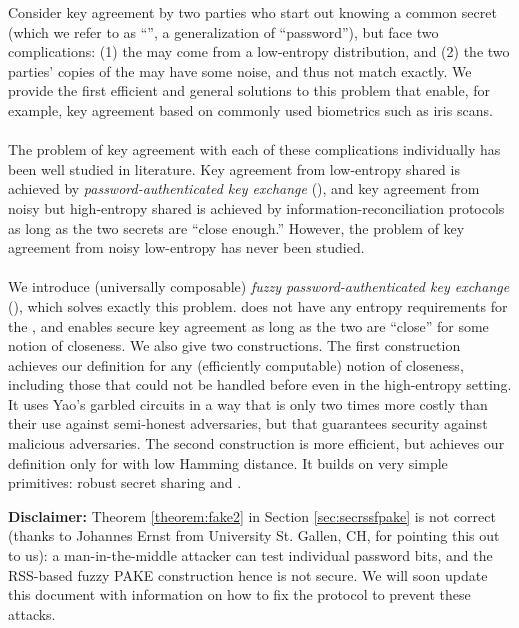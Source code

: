 Consider key agreement by two parties who start out knowing a common secret (which we refer to as ``\password'', a generalization of ``password''),
but face two complications: 
(1) the \password may come from a low-entropy distribution, and 
(2) the two parties' copies of the \password may have some noise, and thus not match exactly.
We provide the first efficient and general solutions to this problem that enable, for example, key agreement based on commonly used biometrics such as iris scans.\\
\\
The problem of key agreement with each of these complications individually has been well studied in literature.
Key agreement from low-entropy shared \passwords is achieved by \emph{password-authenticated key exchange} (\PAKE), and 
key agreement from noisy but high-entropy shared \passwords is achieved by information-reconciliation protocols as long as the two secrets are ``close enough.''
However, the problem of key agreement from noisy low-entropy \passwords has never been studied.\\
\\
We introduce (universally composable) \emph{fuzzy password-authenticated key exchange} (\FAKE), which solves exactly this problem.
\FAKE does not have any entropy requirements for the \passwords, and enables secure key agreement as long as the two \passwords are ``close'' for some notion of closeness.
We also give two constructions. 
The first construction achieves our \FAKE definition for any (efficiently computable) notion of closeness, including those that could not be handled before even in the high-entropy setting.
It uses Yao's garbled circuits in a way that is only two times more costly than their use against semi-honest adversaries, but that guarantees security against malicious adversaries.
The second construction is more efficient, but achieves our \FAKE definition only for \passwords with low Hamming distance.
It builds on very simple primitives: robust secret sharing and \PAKE.

\begin{mdframed}[tikzsetting={draw=red,ultra thick},skipabove=5pt]
\begin{minipage}{\textwidth}
 \textbf{Disclaimer:} Theorem \ref{theorem:fake2} in Section \ref{sec:secrssfpake} is not correct (thanks to Johannes Ernst from University St. Gallen, CH, for pointing this out to us): a man-in-the-middle attacker can test individual password bits, and the RSS-based fuzzy PAKE construction hence is not secure. We will soon update this document with information on how to fix the protocol to prevent these attacks. 
\end{minipage}
\end{mdframed}
